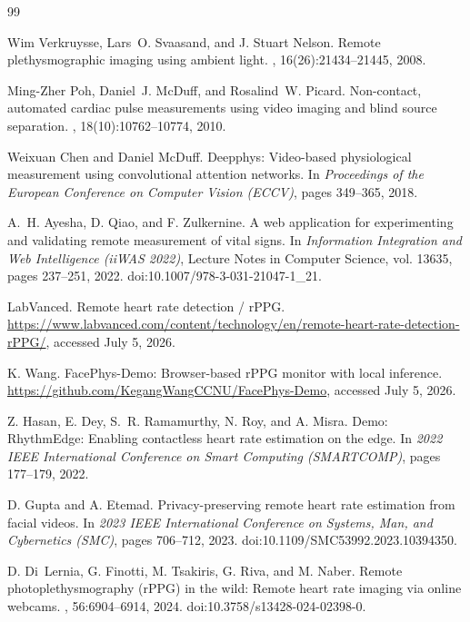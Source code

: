 \documentclass[dvipdfmx]{ehis}
\begin{document}
{\footnotesize
\begin{thebibliography}{99}
\footnotesize\baselineskip=8.0pt\setlength{\itemsep}{0pt}\setlength{\parsep}{0pt}

Wim Verkruysse, Lars~O. Svaasand, and J. Stuart Nelson.
\newblock Remote plethysmographic imaging using ambient light.
, 16(26):21434--21445, 2008.

Ming-Zher Poh, Daniel~J. McDuff, and Rosalind~W. Picard.
\newblock Non-contact, automated cardiac pulse measurements using video imaging and blind source separation.
, 18(10):10762--10774, 2010.

Weixuan Chen and Daniel McDuff.
\newblock Deepphys: Video-based physiological measurement using convolutional attention networks.
\newblock In {\em Proceedings of the European Conference on Computer Vision (ECCV)}, pages 349--365, 2018.

A.~H. Ayesha, D. Qiao, and F. Zulkernine.
\newblock A web application for experimenting and validating remote measurement of vital signs.
\newblock In {\em Information Integration and Web Intelligence (iiWAS 2022)}, Lecture Notes in Computer Science, vol. 13635, pages 237--251, 2022.
\newblock doi:10.1007/978-3-031-21047-1\_21.

LabVanced.
\newblock Remote heart rate detection / rPPG.
\newblock \url{https://www.labvanced.com/content/technology/en/remote-heart-rate-detection-rPPG/}, accessed July 5, 2026.

K. Wang.
\newblock FacePhys-Demo: Browser-based rPPG monitor with local inference.
\newblock \url{https://github.com/KegangWangCCNU/FacePhys-Demo}, accessed July 5, 2026.

Z. Hasan, E. Dey, S.~R. Ramamurthy, N. Roy, and A. Misra.
\newblock Demo: RhythmEdge: Enabling contactless heart rate estimation on the edge.
\newblock In {\em 2022 IEEE International Conference on Smart Computing (SMARTCOMP)}, pages 177--179, 2022.

D. Gupta and A. Etemad.
\newblock Privacy-preserving remote heart rate estimation from facial videos.
\newblock In {\em 2023 IEEE International Conference on Systems, Man, and Cybernetics (SMC)}, pages 706--712, 2023.
\newblock doi:10.1109/SMC53992.2023.10394350.

D. Di~Lernia, G. Finotti, M. Tsakiris, G. Riva, and M. Naber.
\newblock Remote photoplethysmography (rPPG) in the wild: Remote heart rate imaging via online webcams.
, 56:6904--6914, 2024.
\newblock doi:10.3758/s13428-024-02398-0.


\end{thebibliography}}
\end{document}
